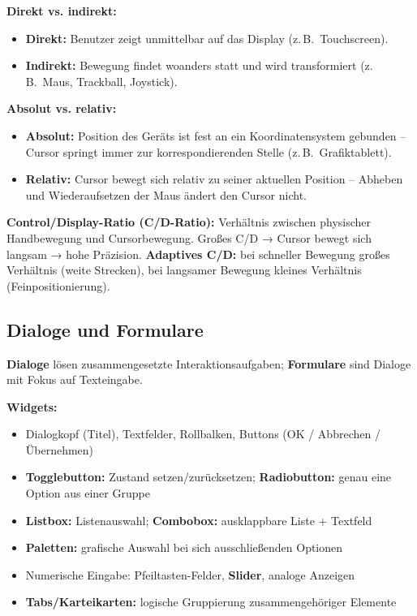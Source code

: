 \documentclass[12pt, a4paper]{article}
\begin{document}
\textbf{Direkt vs. indirekt:}
\begin{itemize}
  \item \textbf{Direkt:} Benutzer zeigt unmittelbar auf das Display (z.\,B.\ Touchscreen).
  \item \textbf{Indirekt:} Bewegung findet woanders statt und wird transformiert (z.\,B.\ Maus, Trackball, Joystick).
\end{itemize}

\textbf{Absolut vs. relativ:}
\begin{itemize}
  \item \textbf{Absolut:} Position des Geräts ist fest an ein Koordinatensystem gebunden -- Cursor springt immer zur korrespondierenden Stelle (z.\,B.\ Grafiktablett).
  \item \textbf{Relativ:} Cursor bewegt sich relativ zu seiner aktuellen Position -- Abheben und Wiederaufsetzen der Maus ändert den Cursor nicht.
\end{itemize}

\textbf{Control/Display-Ratio (C/D-Ratio):} Verhältnis zwischen physischer Handbewegung und Cursorbewegung. Großes C/D → Cursor bewegt sich langsam → hohe Präzision. \textbf{Adaptives C/D:} bei schneller Bewegung großes Verhältnis (weite Strecken), bei langsamer Bewegung kleines Verhältnis (Feinpositionierung).

\subsection{Dialoge und Formulare}

\textbf{Dialoge} lösen zusammengesetzte Interaktionsaufgaben; \textbf{Formulare} sind Dialoge mit Fokus auf Texteingabe.

\textbf{Widgets:}
\begin{itemize}
  \item Dialogkopf (Titel), Textfelder, Rollbalken, Buttons (OK / Abbrechen / Übernehmen)
  \item \textbf{Togglebutton:} Zustand setzen/zurücksetzen; \textbf{Radiobutton:} genau eine Option aus einer Gruppe
  \item \textbf{Listbox:} Listenauswahl; \textbf{Combobox:} ausklappbare Liste + Textfeld
  \item \textbf{Paletten:} grafische Auswahl bei sich ausschließenden Optionen
  \item Numerische Eingabe: Pfeiltasten-Felder, \textbf{Slider}, analoge Anzeigen
  \item \textbf{Tabs/Karteikarten:} logische Gruppierung zusammengehöriger Elemente
\end{itemize}
\end{document}
